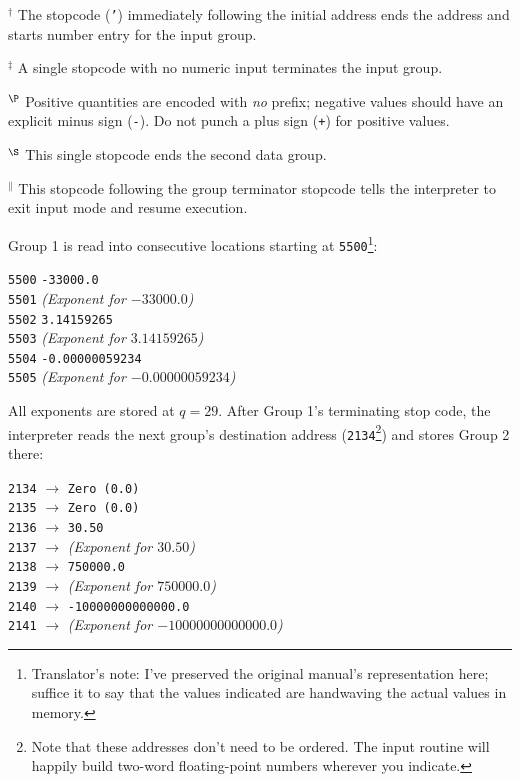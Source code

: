 \vspace{1em}
\nopagebreak
\medskip
$^{\dagger}$ The stopcode (\texttt{'}) immediately following the initial address ends the address and starts number entry for the input group.

\medskip
$^{\ddagger}$ A single stopcode with no numeric input terminates the input group.

\medskip
$^{\P}$ Positive quantities are encoded with \emph{no} prefix; negative values should have an explicit minus sign (\texttt{-}). Do not punch a plus sign (\texttt{+}) for positive values.

\medskip
$^{\S}$ This single stopcode ends the second data group.

\medskip
$^{\parallel}$ This stopcode following the group terminator stopcode tells the interpreter to exit input mode and resume execution.

\medskip

Group 1 is read into consecutive locations starting at \texttt{5500}\footnote{Translator's note: I've preserved the original manual's representation here; suffice it to say that the values indicated are handwaving the actual values in memory.}:

\texttt{5500} \texttt{-33000.0} \\
\texttt{5501} \textit{(Exponent for $-33000.0$)} \\
\texttt{5502} \texttt{3.14159265} \\
\texttt{5503} \textit{(Exponent for $3.14159265$)} \\
\texttt{5504} \texttt{-0.00000059234} \\
\texttt{5505} \textit{(Exponent for $-0.00000059234$)}

All exponents are stored at $q = 29$. After Group 1's terminating stop code, the interpreter reads the next group's destination address (\texttt{2134}\footnote{Note that these addresses don't need to be ordered. The input routine will happily build two-word floating-point numbers wherever you indicate.}) and stores Group 2 there:

\texttt{2134} $\rightarrow$ \texttt{Zero (0.0)} \\
\texttt{2135} $\rightarrow$ \texttt{Zero (0.0)} \\
\texttt{2136} $\rightarrow$ \texttt{30.50} \\
\texttt{2137} $\rightarrow$ \textit{(Exponent for $30.50$)} \\
\texttt{2138} $\rightarrow$ \texttt{750000.0} \\
\texttt{2139} $\rightarrow$ \textit{(Exponent for $750000.0$)} \\
\texttt{2140} $\rightarrow$ \texttt{-10000000000000.0} \\
\texttt{2141} $\rightarrow$ \textit{(Exponent for $-10000000000000.0$)}

